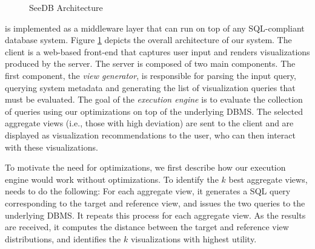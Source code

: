 \begin{figure}[htb]
\vspace{-10pt}
\centerline{
\hbox{}}
\vspace{-12pt}
\caption{SeeDB Architecture}
\vspace{-10pt}
\label{fig:sys-arch}
\end{figure} 


\SeeDB is implemented as a middleware layer that can run on
top of any SQL-compliant database system. 
Figure \ref{fig:sys-arch} depicts the overall architecture of our
system.  The \SeeDB client is a web-based front-end that captures user
input and renders visualizations produced by the \SeeDB server.  The
\SeeDB server is composed of two main components. The first
component, the {\it view generator}, is responsible for parsing the
input query, querying system metadata and generating the list of
visualization queries that must be evaluated.  
The goal of the {\em execution engine} is to evaluate the collection of queries
 using our optimizations on top of
the underlying DBMS.
The selected aggregate views (i.e., those with high deviation) 
are sent to the \SeeDB client 
and are displayed as visualization recommendations to the user, 
who can then interact with these
visualizations.

To motivate the need for optimizations, we first describe 
how our execution engine would work without optimizations. 
To identify the $k$ best aggregate views,
\SeeDB needs to do the following:
For each aggregate view, it generates
a SQL query corresponding to the target
and reference view, and issues
the two queries to the underlying DBMS.
It repeats this process for each aggregate view.
As the results are received, it computes the
distance between the target and reference view
distributions, and identifies the $k$ visualizations
with highest utility. 

